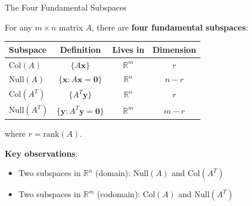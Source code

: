\documentclass[10pt]{beamer}
\theoremstyle{definition}
\newcommand{\x}[1]{\alert{\textbf{#1}}}
\begin{document}
\begin{frame}{The Four Fundamental Subspaces}

For any $m \times n$ matrix $A$, there are \x{four fundamental subspaces}:

\vspace{1em}

\begin{center}
\begin{tabular}{|l|c|c|c|}
\hline
\textbf{Subspace} & \textbf{Definition} & \textbf{Lives in} & \textbf{Dimension} \\
\hline
$\text{Col}(A)$ & $\{A\mathbf{x}\}$ & $\mathbb{R}^m$ & $r$ \\
$\text{Null}(A)$ & $\{\mathbf{x} : A\mathbf{x} = \mathbf{0}\}$ & $\mathbb{R}^n$ & $n - r$ \\
$\text{Col}(A^T)$ & $\{A^T \mathbf{y}\}$ & $\mathbb{R}^n$ & $r$ \\
$\text{Null}(A^T)$ & $\{\mathbf{y} : A^T \mathbf{y} = \mathbf{0}\}$ & $\mathbb{R}^m$ & $m - r$ \\
\hline
\end{tabular}
\end{center}

\vspace{0.5em}

where $r = \text{rank}(A)$.

\vspace{1em}

\x{Key observations}:
\begin{itemize}
\item Two subspaces in $\mathbb{R}^n$ (domain): $\text{Null}(A)$ and $\text{Col}(A^T)$
\item Two subspaces in $\mathbb{R}^m$ (codomain): $\text{Col}(A)$ and $\text{Null}(A^T)$
\end{itemize}

\end{frame}
\end{document}
